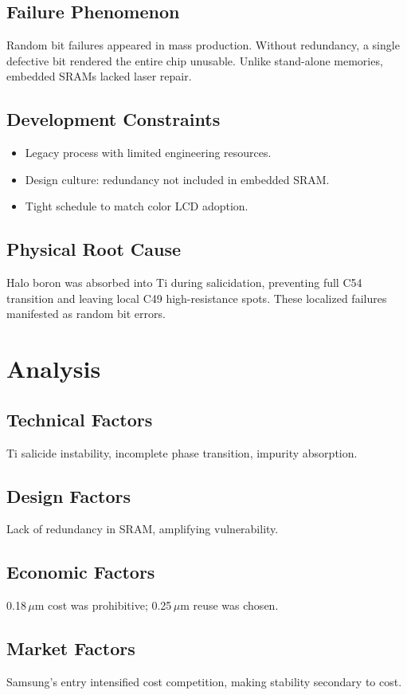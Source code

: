 \documentclass[conference]{IEEEtran}
\begin{document}
\subsection{Failure Phenomenon}
Random bit failures appeared in mass production.  
Without redundancy, a single defective bit rendered the entire chip unusable. Unlike stand-alone memories, embedded SRAMs lacked laser repair.

\subsection{Development Constraints}
\begin{itemize}
  \item Legacy process with limited engineering resources.  
  \item Design culture: redundancy not included in embedded SRAM.  
  \item Tight schedule to match color LCD adoption.  
\end{itemize}

\subsection{Physical Root Cause}
Halo boron was absorbed into Ti during salicidation, preventing full C54 transition and leaving local C49 high-resistance spots.  
These localized failures manifested as random bit errors.

\section{Analysis}
\subsection{Technical Factors}
Ti salicide instability, incomplete phase transition, impurity absorption.

\subsection{Design Factors}
Lack of redundancy in SRAM, amplifying vulnerability.

\subsection{Economic Factors}
0.18\,$\mu$m cost was prohibitive; 0.25\,$\mu$m reuse was chosen.

\subsection{Market Factors}
Samsung’s entry intensified cost competition, making stability secondary to cost.
\end{document}
